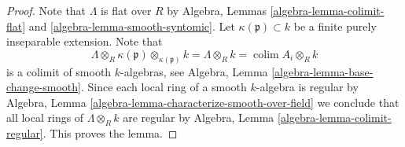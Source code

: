 \documentclass[10pt,a4paper]{amsart}
\theoremstyle{plain}
\theoremstyle{definition}
\theoremstyle{remark}
\numberwithin{equation}{subsection}
\def\colim{\mathop{\mathrm{colim}}\nolimits}
\begin{document}
\begin{proof}
Note that $\Lambda$ is flat over $R$ by
Algebra, Lemmas \ref{algebra-lemma-colimit-flat} and
\ref{algebra-lemma-smooth-syntomic}.
Let $\kappa(\mathfrak p) \subset k$ be a finite purely inseparable
extension. Note that
$$
\Lambda \otimes_R \kappa(\mathfrak p) \otimes_{\kappa(\mathfrak p)} k =
\Lambda \otimes_R k = \colim A_i \otimes_R k
$$
is a colimit of smooth $k$-algebras, see
Algebra, Lemma \ref{algebra-lemma-base-change-smooth}.
Since each local ring of a smooth $k$-algebra is regular by
Algebra, Lemma \ref{algebra-lemma-characterize-smooth-over-field}
we conclude that all local rings of $\Lambda \otimes_R k$ are
regular by
Algebra, Lemma \ref{algebra-lemma-colimit-regular}.
This proves the lemma.
\end{proof}
\end{document}

